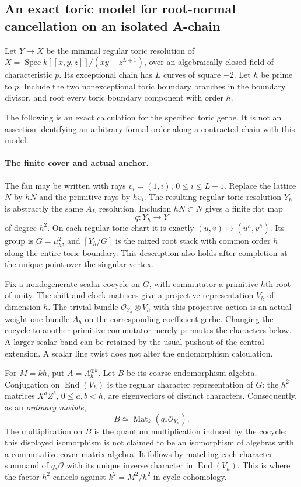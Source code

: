 \subsection*{An exact toric model for root-normal cancellation on an isolated A-chain}

Let $Y\to X$ be the minimal regular toric resolution of
$X=\operatorname{Spec}k[[x,y,z]]/(xy-z^{L+1})$, over an algebraically
closed field of characteristic $p$. Its exceptional chain has $L$
curves of square $-2$. Let $h$ be prime to $p$. Include the two
nonexceptional toric boundary branches in the boundary divisor, and
root every toric boundary component with order $h$.

The following is an exact calculation for the specified toric gerbe.
It is not an assertion identifying an arbitrary formal order along a
contracted chain with this model.

\paragraph{The finite cover and actual anchor.}
The fan may be written with rays $v_i=(1,i)$, $0\le i\le L+1$.
Replace the lattice $N$ by $hN$ and the primitive rays by $hv_i$.
The resulting regular toric resolution $Y_h$ is abstractly the same
$A_L$ resolution. Inclusion $hN\subset N$ gives a finite flat map
\[
                         q:Y_h\longrightarrow Y
\]
of degree $h^2$. On each regular toric chart it is exactly
$(u,v)\mapsto(u^h,v^h)$. Its group is $G=\mu_h^2$, and
$[Y_h/G]$ is the mixed root stack with common order $h$ along the
entire toric boundary. This description also holds after completion
at the unique point over the singular vertex.

Fix a nondegenerate scalar cocycle on $G$, with commutator a primitive
$h$th root of unity. The shift and clock matrices give a projective
representation $V_h$ of dimension $h$. The trivial bundle
$\mathcal O_{Y_h}\otimes V_h$ with this projective action is an actual
weight-one bundle $A_h$ on the corresponding coefficient gerbe.
Changing the cocycle to another primitive commutator merely permutes
the characters below. A larger scalar band can be retained by the
usual pushout of the central extension. A scalar line twist does not
alter the endomorphism calculation.

For $M=kh$, put $A=A_h^{\oplus k}$. Let $B$ be its coarse
endomorphism algebra. Conjugation on $\operatorname{End}(V_h)$ is
the regular character representation of $G$: the $h^2$ matrices
$X^aZ^b$, $0\le a,b<h$, are eigenvectors of distinct characters.
Consequently, as an \emph{ordinary module},
\[
              B\simeq\operatorname{Mat}_k(q_*\mathcal O_{Y_h}).
\]
The multiplication on $B$ is the quantum multiplication induced by
the cocycle; this displayed isomorphism is not claimed to be an
isomorphism of algebras with a commutative-cover matrix algebra.
It follows by matching each character summand of $q_*\mathcal O$
with its unique inverse character in $\operatorname{End}(V_h)$.
This is where the factor $h^2$ cancels against $k^2=M^2/h^2$ in
cycle cohomology.

